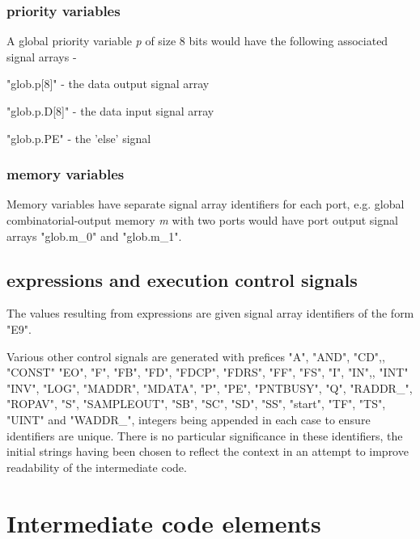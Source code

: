             \subsubsection{priority variables}

                A global priority variable {\em p} of size 8 bits would have
                the following associated signal arrays -
                \blist
                \item   "glob.p[8]" - the data output signal array
                \item   "glob.p.D[8]" - the data input signal array
                \item   "glob.p.PE" - the 'else' signal
                \blend


            \subsubsection{memory variables}

                Memory variables have separate signal array identifiers
                for each port, e.g. global combinatorial-output memory
                {\em m} with two ports would have port output signal arrays
                "glob.m\_0" and "glob.m\_1".


        \subsection{expressions and execution control signals}
        
            The values resulting from expressions are given signal array
            identifiers of the form "E9".
            
            Various other control signals are generated with prefices "A",
            "AND", "CD",, "CONST" "EO", "F", "FB", "FD", "FDCP", "FDRS", "FF",
            "FS", "I", "IN",, "INT" "INV", "LOG", "MADDR", "MDATA", "P", "PE",
            "PNTBUSY", "Q", "RADDR\_", "ROPAV", "S", "SAMPLEOUT", "SB", "SC",
            "SD", "SS", "start", "TF", "TS", "UINT" and "WADDR\_", integers
            being appended in each case to ensure identifiers are unique. There
            is no particular significance in these identifiers, the initial
            strings having been chosen to reflect the context in an attempt to
            improve readability of the intermediate code.


    \section{Intermediate code elements}


